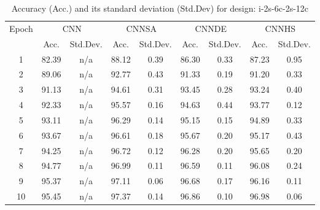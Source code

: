 \documentclass[10pt,letterpaper]{article}
\begin{document}
\begin{table}[]
\small
\caption{Accuracy (Acc.) and its standard deviation (Std.Dev) for design: i-2s-6c-2s-12c}
\label{tab:my_label}

\begin{tabular}{c c c c c c c c c}
\hline
\multicolumn{1}{c}{\multirow{2}{*}{Epoch}} & \multicolumn{2}{c}{CNN} &
\multicolumn{2}{c}{CNNSA} & \multicolumn{2}{c}{CNNDE} & \multicolumn{2}{c}{CNNHS}\\
\cline{2-9}

\multicolumn{1}{r}{}       & \multicolumn{1}{c}{Acc.} & \multicolumn{1}{c}{Std.Dev.} &
\multicolumn{1}{c}{Acc.} & \multicolumn{1}{c}{Std.Dev.}  & \multicolumn{1}{c}{Acc.} &
\multicolumn{1}{c}{Std.Dev.} & \multicolumn{1}{c}{Acc.} & \multicolumn{1}{c}{Std.Dev.} \\
\hline

1		& 82.39 & n/a	 & 88.12 & 0.39	  & 86.30 & 0.33    & 87.23  & 0.95  \\
2 		& 89.06 & n/a	 & 92.77 & 0.43	  & 91.33 & 0.19    & 91.20  & 0.33  \\
3		& 91.13 & n/a	 & 94.61 & 0.31	  & 93.45 & 0.28  	& 93.24  & 0.40  \\
4		& 92.33 & n/a	 & 95.57 & 0.16	  & 94.63 & 0.44 	& 93.77  & 0.12  \\
5		& 93.11	& n/a    & 96.29 & 0.14	  & 95.15 & 0.15    & 94.89  & 0.33 \\
6		& 93.67 & n/a	 & 96.61 & 0.18   & 95.67 & 0.20  	& 95.17  & 0.43 \\
7 		& 94.25	& n/a    & 96.72 & 0.12   & 96.28 & 0.20    & 95.65  & 0.20 \\
8		& 94.77 & n/a	 & 96.99 & 0.11	  & 96.59 & 0.11 	& 96.08  & 0.24 \\
9		& 95.37 & n/a	 & 97.11 & 0.06   & 96.68 & 0.17 	& 96.16  & 0.11 \\
10		& 95.45 & n/a	 & 97.37 & 0.14	  & 96.86 & 0.10	& 96.98  & 0.06 \\

\hline
\end{tabular}
\end{table}
\end{document}
